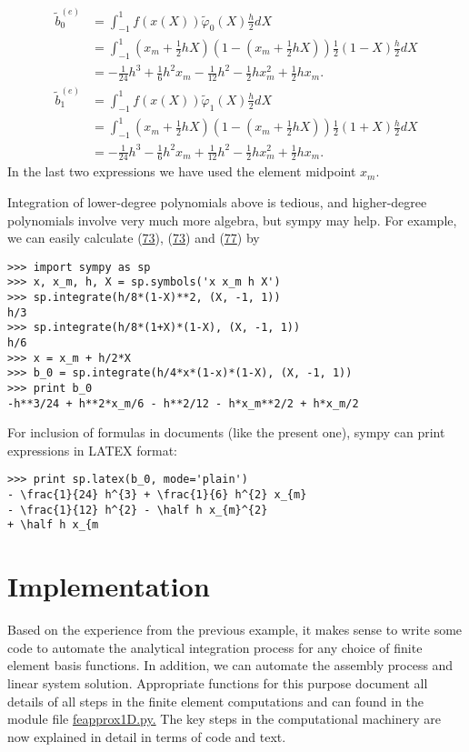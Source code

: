 \documentclass[../main.tex]{subfiles}
\begin{document}
\begin{equation}\label{eqa77}
	\begin{aligned}
		\tilde{b}_{0}^{(e)} &=\int_{-1}^{1} f(x(X)) \tilde{\varphi}_{0}(X) \frac{h}{2} d X \\
		&=\int_{-1}^{1}\left(x_{m}+\frac{1}{2} h X\right)\left(1-\left(x_{m}+\frac{1}{2} h X\right)\right) \frac{1}{2}(1-X) \frac{h}{2} d X \\
		&=-\frac{1}{24} h^{3}+\frac{1}{6} h^{2} x_{m}-\frac{1}{12} h^{2}-\frac{1}{2} h x_{m}^{2}+\frac{1}{2} h x_{m}.
	\end{aligned}
\end{equation}
\begin{equation}\label{eqa78}
	\begin{aligned}
		\tilde{b}_{1}^{(e)} &=\int_{-1}^{1} f(x(X)) \tilde{\varphi}_{1}(X) \frac{h}{2} d X \\
		&=\int_{-1}^{1}\left(x_{m}+\frac{1}{2} h X\right)\left(1-\left(x_{m}+\frac{1}{2} h X\right)\right) \frac{1}{2}(1+X) \frac{h}{2} d X \\
		&=-\frac{1}{24} h^{3}-\frac{1}{6} h^{2} x_{m}+\frac{1}{12} h^{2}-\frac{1}{2} h x_{m}^{2}+\frac{1}{2} h x_{m}.
	\end{aligned}
\end{equation}
In the last two expressions we have used the element midpoint $x_{m}$.

Integration of lower-degree polynomials above is tedious, and higher-degree polynomials involve very much more algebra, but sympy may help. For example, we can easily calculate (\hyperref[eqa73]{73}), (\hyperref[eqa73]{73}) and (\hyperref[eqa77]{77}) by
\begin{lstlisting}[numbers=none]
>>> import sympy as sp
>>> x, x_m, h, X = sp.symbols('x x_m h X')
>>> sp.integrate(h/8*(1-X)**2, (X, -1, 1))
h/3
>>> sp.integrate(h/8*(1+X)*(1-X), (X, -1, 1))
h/6
>>> x = x_m + h/2*X
>>> b_0 = sp.integrate(h/4*x*(1-x)*(1-X), (X, -1, 1))
>>> print b_0
-h**3/24 + h**2*x_m/6 - h**2/12 - h*x_m**2/2 + h*x_m/2	
\end{lstlisting}
For inclusion of formulas in documents (like the present one), sympy can print
expressions in LATEX format:
\begin{lstlisting}[numbers=none]
>>> print sp.latex(b_0, mode='plain')
- \frac{1}{24} h^{3} + \frac{1}{6} h^{2} x_{m}
- \frac{1}{12} h^{2} - \half h x_{m}^{2}
+ \half h x_{m
\end{lstlisting}
\chapter{Implementation}
\label{chap:chap_4}
\noindent Based on the experience from the previous example, it makes sense to write
some code to automate the analytical integration process for any choice of finite
element basis functions. In addition, we can automate the assembly process
and linear system solution. Appropriate functions for this purpose document
all details of all steps in the finite element computations and can found in the
module file \href{https://github.com/hplgit/INF5620/blob/master/src/fem/fe_approx1D.py}{fe\textunderscore approx1D.py.} The key steps in the computational machinery are
now explained in detail in terms of code and text.
\end{document}
